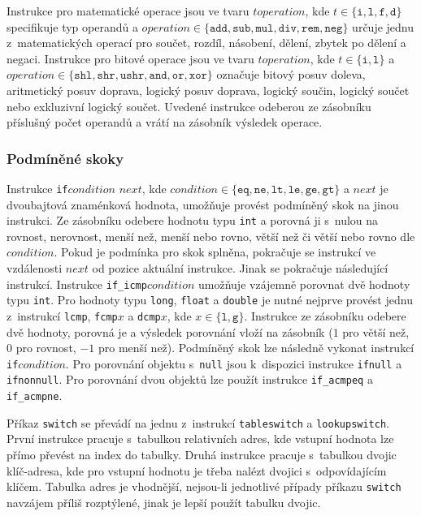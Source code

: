 Instrukce pro matematické operace jsou ve tvaru $t operation$, 
kde $t \in \{\texttt{i}, \texttt{l}, \texttt{f}, \texttt{d} \}$ specifikuje typ operandů 
a $operation \in \{\texttt{add},\texttt{sub}, \texttt{mul}, \texttt{div}, \texttt{rem}, \texttt{neg} \}$ určuje jednu z~matematických operací pro součet, rozdíl, násobení, dělení, zbytek po dělení a negaci. 
Instrukce pro bitové operace jsou ve tvaru $t operation$, 
kde $t \in \{\texttt{i}, \texttt{l}\}$ 
a $operation \in \{\texttt{shl},\texttt{shr}, \texttt{ushr}, \texttt{and}, \texttt{or}, \texttt{xor}\}$ označuje bitový posuv doleva, aritmetický posuv doprava, logický posuv doprava, logický součin, logický součet nebo  exkluzivní logický součet. 
Uvedené instrukce odeberou ze zásobníku příslušný počet operandů a vrátí na zásobník výsledek operace.

\subsubsection{Podmíněné skoky}

Instrukce \texttt{if}$condition$ $next$, kde $condition \in \{ \texttt{eq}, \texttt{ne}, \texttt{lt}, \texttt{le}, \texttt{ge}, \texttt{gt}\}$ a $next$ je dvoubajtová znaménková hodnota, umožňuje provést podmíněný skok na jinou instrukci. Ze zásobníku odebere hodnotu typu \texttt{int} a porovná ji s~nulou na rovnost, nerovnost, menší než, menší nebo rovno, větší než či větší nebo rovno dle $condition$. Pokud je podmínka pro skok splněna, pokračuje se instrukcí ve vzdálenosti $next$ od pozice aktuální instrukce. Jinak se pokračuje následující instrukcí. Instrukce \texttt{if\_icmp}$condition$ umožňuje vzájemně porovnat dvě hodnoty typu \texttt{int}.
 Pro hodnoty typu \texttt{long}, \texttt{float} a \texttt{double} je nutné nejprve provést jednu z~instrukcí \texttt{lcmp}, \texttt{fcmp}$x$ a \texttt{dcmp}$x$, kde $x \in \{\texttt{l}, \texttt{g} \}$. Instrukce ze zásobníku odebere dvě hodnoty, porovná je a výsledek porovnání vloží na zásobník ($1$ pro větší než, $0$ pro rovnost, $-1$ pro menší než). Podmíněný skok lze následně vykonat instrukcí \texttt{if}$condition$.
Pro porovnání objektu s~\texttt{null} jsou k~dispozici instrukce \texttt{ifnull} a \texttt{ifnonnull}. Pro porovnání dvou objektů lze použít instrukce \texttt{if\_acmpeq} a \texttt{if\_acmpne}.

Příkaz \texttt{switch} se převádí na jednu z~instrukcí \texttt{tableswitch} a \texttt{lookupswitch}. První instrukce pracuje s~tabulkou relativních adres, kde vstupní hodnota lze přímo převést na index do tabulky. Druhá instrukce pracuje s~tabulkou dvojic klíč-adresa, kde pro vstupní hodnotu je třeba nalézt dvojici s~odpovídajícím klíčem. Tabulka adres je vhodnější, nejsou-li jednotlivé případy příkazu \texttt{switch} navzájem příliš rozptýlené, jinak je lepší použít tabulku dvojic.

